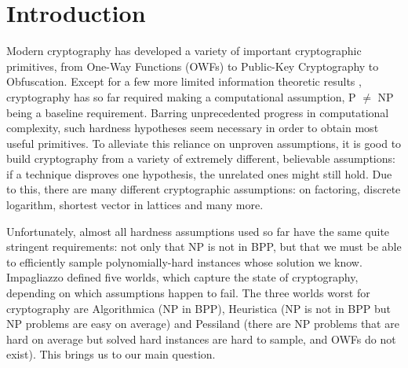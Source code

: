 \section{Introduction}




Modern cryptography has developed a variety of important cryptographic primitives, from One-Way Functions (OWFs) to Public-Key Cryptography to Obfuscation. 
Except for a few more limited information theoretic results \cite{Shamir79,CKGS98,RW02}, cryptography has so far required making a computational assumption, P $\neq$ NP being a baseline requirement.
Barring unprecedented progress in computational complexity, such hardness hypotheses seem necessary in order to obtain most useful primitives. 
To alleviate this reliance on unproven assumptions, it is good to build cryptography from a variety of extremely different, believable assumptions: if a technique disproves one hypothesis, the unrelated ones might still hold. Due to this, there are many different cryptographic assumptions: on factoring, discrete logarithm, shortest vector in lattices and many more.




Unfortunately, almost all hardness assumptions used so far have the same quite stringent requirements: not only that NP is not in BPP, but that we must be able to efficiently sample polynomially-hard instances whose solution we know. Impagliazzo \cite{Impagliazzo5worlds,RR94} defined five worlds, which capture the state of cryptography, depending on which assumptions happen to fail. The three worlds worst for cryptography are Algorithmica (NP in BPP), Heuristica (NP is not in BPP but NP problems are easy on average) and Pessiland (there are NP problems that are hard on average but solved hard instances are hard to sample, and OWFs do not exist). 
This brings us to our main question.

